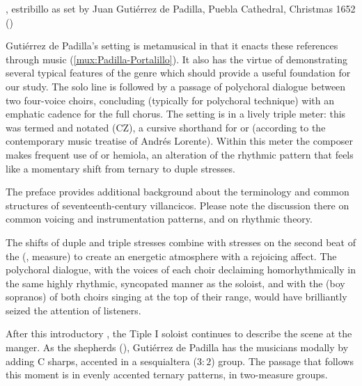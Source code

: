 {, estribillo as set by Juan Gutiérrez
de Padilla, Puebla Cathedral, Christmas 1652 
()}

Gutiérrez de Padilla's setting is metamusical in that it enacts these
references through music (\cref{mux:Padilla-Portalillo}).
It also has the virtue of demonstrating several typical features of the genre
which should provide a useful foundation for our study.
The solo line is followed by a passage of polychoral dialogue between two
four-voice choirs, concluding (typically for polychoral technique) with an
emphatic cadence for the full chorus.  
The setting is in a lively triple meter: this was termed  and notated \meterCZ{} (CZ), a cursive shorthand for
\meterCThreeTwo{} or \meterCThree{} (according to the contemporary music
treatise of Andrés Lorente).%
    \citXXX[Lorente]
Within this meter the composer makes frequent use of  or
hemiola, an alteration of the rhythmic pattern that feels like a momentary
shift from ternary to duple stresses.%
\begin{Footnote}
    The preface provides additional background about the terminology and common structures of seventeenth-century villancicos.
    Please note the discussion there on common voicing and instrumentation patterns, and on rhythmic theory.
\end{Footnote}
The shifts of duple and triple stresses combine with stresses on the second
beat of the  (, measure) to create an energetic
atmosphere with a rejoicing affect.  
The polychoral dialogue, with the voices of each choir declaiming
homorhythmically in the same highly rhythmic, syncopated manner as the soloist,
and with the  (boy sopranos) of both choirs singing at the top of
their range, would have brilliantly seized the attention of listeners.

After this introductory , the Tiple I soloist continues to
describe the scene at the manger.  
As the shepherds  (),
Gutiérrez de Padilla has the musicians  modally by adding C
sharps, accented in a sesquialtera ($3:2$) group.
The passage that follows this moment is in evenly accented ternary patterns, in
two-measure groups.  

